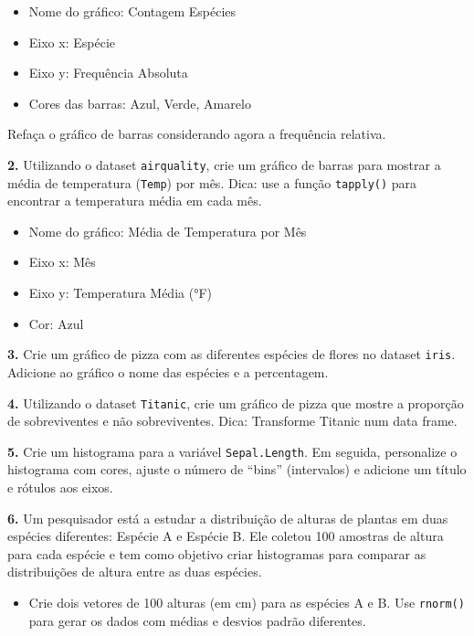\documentclass[
]{book}
\providecommand{\tightlist}{%
  \setlength{\itemsep}{0pt}\setlength{\parskip}{0pt}}
\begin{document}
\begin{itemize}
\tightlist
\item
  Nome do gráfico: Contagem Espécies
\item
  Eixo x: Espécie
\item
  Eixo y: Frequência Absoluta
\item
  Cores das barras: Azul, Verde, Amarelo
\end{itemize}

Refaça o gráfico de barras considerando agora a frequência relativa.

\textbf{2.} Utilizando o dataset \texttt{airquality}, crie um gráfico de barras para
mostrar a média de temperatura (\texttt{Temp}) por mês. Dica: use a função
\texttt{tapply()} para encontrar a temperatura média em cada mês.

\begin{itemize}
\tightlist
\item
  Nome do gráfico: Média de Temperatura por Mês
\item
  Eixo x: Mês
\item
  Eixo y: Temperatura Média (°F)
\item
  Cor: Azul
\end{itemize}

\textbf{3.} Crie um gráfico de pizza com as diferentes espécies de flores no
dataset \texttt{iris}. Adicione ao gráfico o nome das espécies e a percentagem.

\textbf{4.} Utilizando o dataset \texttt{Titanic}, crie um gráfico de pizza que
mostre a proporção de sobreviventes e não sobreviventes. Dica:
Transforme Titanic num data frame.

\textbf{5.} Crie um histograma para a variável \texttt{Sepal.Length}. Em seguida,
personalize o histograma com cores, ajuste o número de ``bins''
(intervalos) e adicione um título e rótulos aos eixos.

\textbf{6.} Um pesquisador está a estudar a distribuição de alturas de plantas em duas espécies diferentes: Espécie A e Espécie B. Ele coletou 100 amostras de altura para cada espécie e tem como objetivo criar histogramas para comparar as distribuições de altura entre as duas espécies.

\begin{itemize}
\tightlist
\item
  Crie dois vetores de 100 alturas (em cm) para as espécies A e B. Use \texttt{rnorm()} para gerar os dados com médias e desvios padrão diferentes.
\end{itemize}
\end{document}
